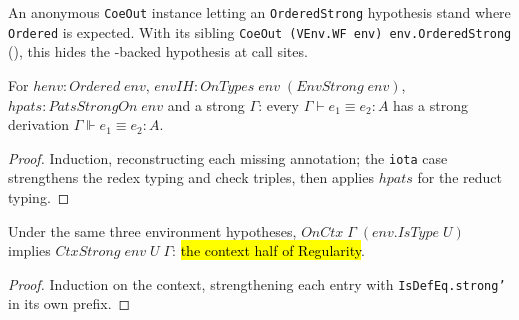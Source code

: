 \begin{definition}
\label{instance:coeout-orderedstrong}
\leanok
{}

 An anonymous \texttt{CoeOut} instance letting an \texttt{OrderedStrong}
hypothesis stand where \texttt{Ordered} is expected.
 With its sibling \texttt{CoeOut (VEnv.WF env) env.OrderedStrong}
(), this hides the \stSorry{}-backed
hypothesis at call sites.
\end{definition}

\begin{theorem}
\label{thm:isdefeq-strong-prime}
\leanok
{}

 For $henv:Ordered\;env$, $envIH:OnTypes\;env\;(EnvStrong\;env)$,
$hpats:PatsStrongOn\;env$ and a strong $\Gamma$: every $\Gamma\vdash e_1\equiv e_2:A$ has a
strong derivation $\Gamma\Vdash e_1\equiv e_2:A$.
\end{theorem}
\begin{proof}
\leanok
{} Induction, reconstructing each missing annotation; the \texttt{iota} case
strengthens the redex typing and check triples, then applies $hpats$ for the reduct typing.
\end{proof}

\begin{lemma}
\label{thm:ctxstrong-strong-prime}
\leanok
{}

 Under the same three environment hypotheses,
$OnCtx\;\Gamma\;(env.IsType\;U)$ implies $CtxStrong\;env\;U\;\Gamma$: \hl{the context half of
Regularity}.
\end{lemma}
\begin{proof}
\leanok
{} Induction on the context, strengthening each entry with \texttt{IsDefEq.strong'} in
its own prefix.
\end{proof}

